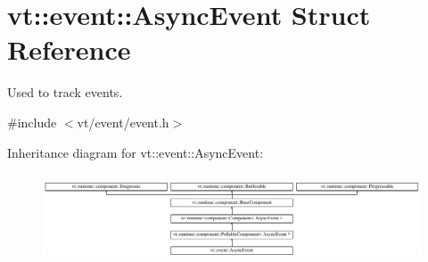 \hypertarget{structvt_1_1event_1_1_async_event}{}\section{vt\+:\+:event\+:\+:Async\+Event Struct Reference}
\label{structvt_1_1event_1_1_async_event}


Used to track events.  




{\ttfamily \#include $<$vt/event/event.\+h$>$}

Inheritance diagram for vt\+:\+:event\+:\+:Async\+Event\+:\begin{figure}[H]
\begin{center}
\leavevmode
\includegraphics[height=2.666667cm]{structvt_1_1event_1_1_async_event}
\end{center}
\end{figure}

